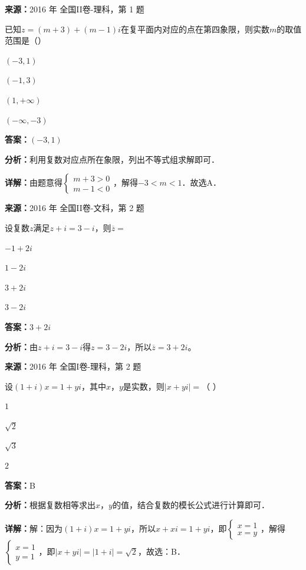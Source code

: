 \begin{question}[points=5]
\textbf{来源：}2016 年 全国II卷-理科，第 1 题\par
已知$z=(m+3)+(m-1)i$在复平面内对应的点在第四象限，则实数$m$的取值范围是（\quad）
\begin{choices}
  \item $(-3,1)$
  \item $(-1,3)$
  \item $(1,+\infty)$
  \item $(-\infty,-3)$
\end{choices}
\begin{solution}
\textbf{答案：}$(-3,1)$

\textbf{分析：}利用复数对应点所在象限，列出不等式组求解即可．

\textbf{详解：}由题意得$\begin{cases} m+3>0 \\ m-1<0 \end{cases}$，解得$-3<m<1$．故选A．
\end{solution}
\end{question}

\begin{question}[points=5]
\textbf{来源：}2016 年 全国II卷-文科，第 2 题\par
设复数$z$满足$z+i=3-i$，则$\overline{z}=$
\begin{choices}
  \item $-1+2i$
  \item $1-2i$
  \item $3+2i$
  \item $3-2i$
\end{choices}
\begin{solution}
\textbf{答案：}$3+2i$

\textbf{分析：}由$z+i=3-i$得$z=3-2i$，所以$\overline{z}=3+2i$。
\end{solution}
\end{question}

\begin{question}[points=5]
\textbf{来源：}2016 年 全国I卷-理科，第 2 题\par
设$(1+i)x=1+yi$，其中$x$，$y$是实数，则$|x+yi|=$（ ）
\begin{choices}
  \item $1$
  \item $\sqrt{2}$
  \item $\sqrt{3}$
  \item $2$
\end{choices}
\begin{solution}
\textbf{答案：}B

\textbf{分析：}根据复数相等求出$x$，$y$的值，结合复数的模长公式进行计算即可．

\textbf{详解：}解：因为$(1+i)x=1+yi$，所以$x+xi=1+yi$，即$\begin{cases}x=1\\x=y\end{cases}$，解得$\begin{cases}x=1\\y=1\end{cases}$，即$|x+yi|=|1+i|=\sqrt{2}$，故选：B．
\end{solution}
\end{question}

